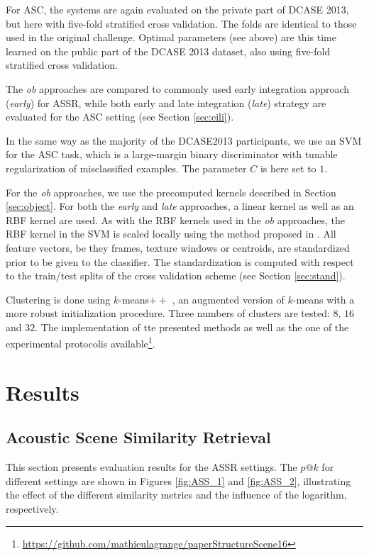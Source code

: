 \documentclass[journal]{IEEEtran}
\begin{document}
For ASC, the systems are again evaluated on the private part of DCASE 2013, but here with five-fold stratified cross validation. The folds are identical to those used in the original challenge. Optimal parameters (see above) are this time learned on the public part of the DCASE 2013 dataset, also using five-fold stratified cross validation.

The \emph{ob} approaches are compared to commonly used early integration approach (\emph{early}) for ASSR, while both early and late integration (\emph{late}) strategy are evaluated for the ASC setting (see Section \ref{sec:eili}).

In the same way as the majority of the DCASE2013 participants, we use an SVM for the ASC task, which is a large-margin binary discriminator with tunable regularization of misclassified examples. The parameter $C$ is here set to $1$.

For the \emph{ob} approaches, we use the precomputed kernels described in Section \ref{sec:object}. For both the \emph{early} and \emph{late} approaches, a linear kernel as well as an RBF kernel are used. As with the RBF kernels used in the \emph{ob} approaches, the RBF kernel in the SVM is scaled locally using the method proposed in \cite{selfTuneManor2004}. All feature vectors, be they frames, texture windows or centroids, are standardized prior to be given to the classifier. The standardization is computed with respect to the train/test splits of the cross validation scheme (see Section \ref{sec:stand}).

Clustering is done using $k$-means$++$ \cite{arthur2007k}, an augmented version of $k$-means with a more robust initialization procedure. Three numbers of clusters are tested: $8$, $16$ and $32$. The implementation of tte presented methods as well as the one of the experimental protocolis available\footnote{\url{https://github.com/mathieulagrange/paperStructureScene16}}. 

\section{Results \label{sec:results}}



\subsection{Acoustic Scene Similarity Retrieval}

This section presents evaluation results for the ASSR settings. The $p@k$ for different settings are shown in Figures \ref{fig:ASS_1} and \ref{fig:ASS_2}, illustrating the effect of the different similarity metrics and the influence of the logarithm, respectively.
\end{document}
